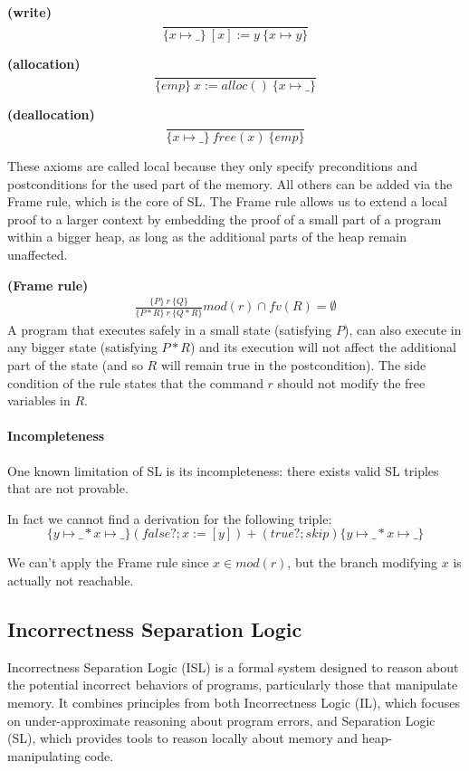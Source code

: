 \documentclass[parskip=half]{scrartcl}
\begin{document}
\textbf{(write)} 
\[
\frac{}{\{x\mapsto \_\}\ [x]:=y\ \{x\mapsto y\}}
\]

\textbf{(allocation)} 
\[
\frac{}{\{emp\}\ x:=alloc()\ \{x\mapsto \_\}}
\]

\textbf{(deallocation)} 
\[
\frac{}{\{x\mapsto \_\}\ free(x)\ \{emp\}}
\]

These axioms are called local because they only specify preconditions and postconditions for the used part of the memory. All others can be added via the Frame rule, which is the core of SL. The Frame rule allows us to extend a local proof to a larger context by embedding the proof of a small part of a program within a bigger heap, as long as the additional parts of the heap remain unaffected.

\textbf{(Frame rule)} 
\begin{align*}
    \frac{\{P\}\ r\ \{Q\}}{\{P\ast R\}\ r\ \{Q\ast R\}}mod(r)\cap fv(R)=\emptyset
\end{align*}
A program that executes safely in a small state (satisfying \(P\)), can also execute in any bigger state (satisfying \(P\ast R\)) and its execution will not affect the additional part of the state (and so \(R\) will remain true in the postcondition).
The side condition of the rule states that the command \(r\) should not modify the free variables in \(R\).

\paragraph{Incompleteness}
One known limitation of SL is its incompleteness: there exists valid SL triples that are not provable.

In fact we cannot find a derivation for the following triple:
\[
\{y\mapsto\_\ast x\mapsto\_\}(false?;x:=[y])+(true?;skip)\{y\mapsto\_\ast x\mapsto\_\}
\]

We can't apply the Frame rule since $x\in mod(r)$, but the branch modifying $x$ is actually not reachable.

\subsection{Incorrectness Separation Logic} \label{ISL}
Incorrectness Separation Logic (ISL) is a formal system designed to reason about the potential incorrect behaviors of programs, particularly those that manipulate memory. It combines principles from both Incorrectness Logic (IL), which focuses on under-approximate reasoning about program errors, and Separation Logic (SL), which provides tools to reason locally about memory and heap-manipulating code.
\end{document}
